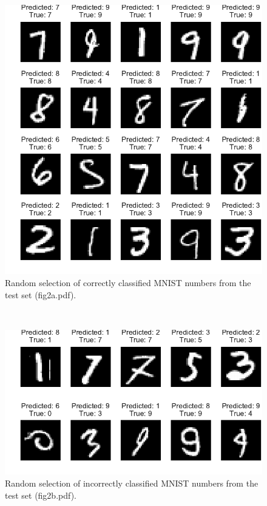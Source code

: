\documentclass{article}
\begin{document}
\begin{figure}[H]
        \centering
        \includegraphics{fig2a.pdf}
        \caption[width=7in]{Random selection of correctly classified MNIST numbers from the test set (fig2a.pdf).}
        \label{fig2a}
\end{figure}

\noindent \\
\begin{figure}[H]
        \centering
        \includegraphics{fig2b.pdf}
        \caption[width=7in]{Random selection of incorrectly classified MNIST numbers from the test set (fig2b.pdf).}
        \label{fig2b}
\end{figure}
\end{document}
